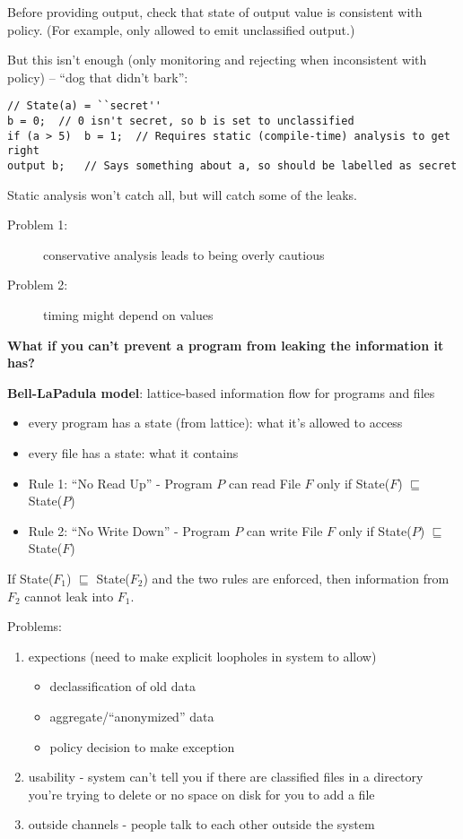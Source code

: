 Before providing output, check that state of output value is consistent with
policy. (For example, only allowed to emit unclassified output.)

But this isn't enough (only monitoring and rejecting when inconsistent with
policy) -- ``dog that didn't bark'':
\begin{verbatim}
// State(a) = ``secret''
b = 0;  // 0 isn't secret, so b is set to unclassified
if (a > 5)  b = 1;  // Requires static (compile-time) analysis to get right
output b;   // Says something about a, so should be labelled as secret
\end{verbatim}
Static analysis won't catch all, but will catch some of the leaks.
\begin{description}
    \item[Problem 1:] conservative analysis leads to being overly cautious
    \item[Problem 2:] timing might depend on values
\end{description}

{\bf What if you can't prevent a program from leaking the information it has?}

{\bf Bell-LaPadula model}: lattice-based information flow for programs and files
\begin{itemize}
\item every program has a state (from lattice): what it's allowed to access
\item every file has a state: what it contains
\item Rule 1: ``No Read Up'' - Program $P$ can read File $F$ only if State($F$)
    $\sqsubseteq$ State($P$)
\item Rule 2: ``No Write Down'' - Program $P$ can write File $F$ only if
    State($P$) $\sqsubseteq$ State($F$)
\end{itemize}
\begin{theorem*} If State($F_1$) $\sqsubseteq$ State($F_2$) and the two rules are
enforced, then information from $F_2$ cannot leak into $F_1$.
\end{theorem*}

Problems:
\begin{enumerate}
    \item expections (need to make explicit loopholes in system to allow)
    \begin{itemize}
        \item declassification of old data
        \item aggregate/``anonymized'' data
        \item policy decision to make exception
    \end{itemize}
    \item usability - system can't tell you if there are classified files in a
        directory you're trying to delete or no space on disk for you to add a
        file
    \item outside channels - people talk to each other outside the system
\end{enumerate}

